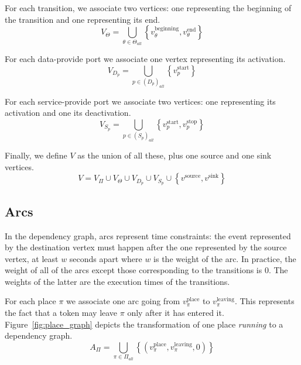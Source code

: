 For each transition, we associate two vertices: one representing the
beginning of the transition and one representing its end.
\[
V_{\Theta}=\bigcup_{\theta\in\Theta_{all}}\left\{ v_\theta^\text{beginning},v_\theta^\text{end}\right\} 
\]

For each data-provide port we associate one vertex representing its activation.
\[
V_{D_p}=\bigcup_{p\in\left(D_p\right)_{all}}\left\{ v_p^\text{start}\right\} 
\]

For each service-provide port we associate two vertices: one representing
its activation and one its deactivation.
\[
V_{S_p}=\bigcup_{p\in\left(S_p\right)_{all}}\left\{ v_p^\text{start},v_p^\text{stop}\right\} 
\]

Finally, we define $V$ as the union of all these, plus one source
and one sink vertices. 
\[
V=V_{\Pi}\cup V_{\Theta}\cup V_{D_p}\cup V_{S_p}\cup\left\{ v^\text{source},v^\text{sink}\right\} 
\]


\subsection{Arcs}

In the dependency graph, arcs represent time constraints: the event represented
by the destination vertex must happen after the one represented by the source
vertex, at least $w$ seconds apart where $w$ is the weight of the arc. In
practice, the weight of all of the arcs except those corresponding to the
transitions is 0. The weights of the latter are the execution times of the
transitions.

For each place $\pi$ we associate one arc going from $v_\pi^\text{place}$ to
$v_\pi^\text{leaving}$. This represents the fact that a token may leave $\pi$
only after it has entered it.
Figure~\ref{fig:place_graph} depicts the transformation of one place
\emph{running} to a dependency graph.
\[
A_{\Pi}=\bigcup_{\pi\in\Pi_{all}}\left\{ \left(v_\pi^\text{place},v_\pi^\text{leaving},0\right)\right\} 
\]



